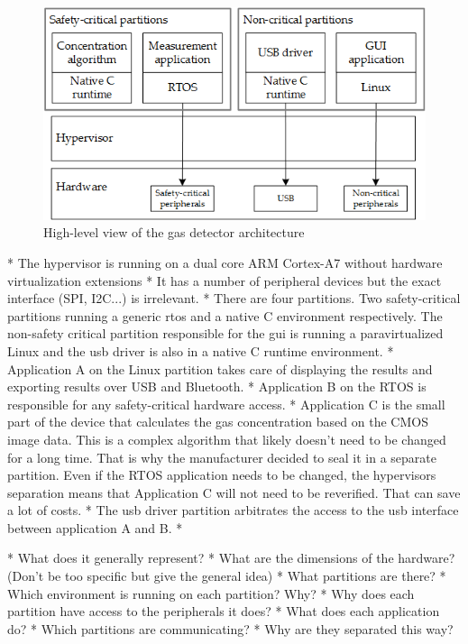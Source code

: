 \begin{figure}[ht!]
\centering
\includegraphics[scale=0.75]{Figures/gas_detect_high_level_no_ipc_with_criticality.png}
\decoRule
\caption{High-level view of the gas detector architecture}
\label{fig:gas_detect_high_level}
\end{figure}

\newcommand{\bToa}{3}
\newcommand{\bToc}{1}
\newcommand{\cTob}{2}
\newcommand{\usbToa}{4}
\newcommand{\aTousb}{4}
\newcommand{\usbTob}{5}
\newcommand{\bTousb}{5}

* The hypervisor is running on a dual core ARM Cortex-A7 without hardware virtualization extensions
* It has a number of peripheral devices but the exact interface (SPI, I2C...) is irrelevant.
* There are four partitions. Two safety-critical partitions running a generic \acrshort{rtos} and a native C environment respectively. The non-safety critical partition responsible for the \acrshort{gui} is running a paravirtualized Linux and the \acrshort{usb} driver is also in a native C runtime environment.
* Application A on the Linux partition takes care of displaying the results and exporting results over USB and Bluetooth.
* Application B on the RTOS is responsible for any safety-critical hardware access.
* Application C is the small part of the device that calculates the gas concentration based on the CMOS image data. This is a complex algorithm that likely doesn't need to be changed for a long time. That is why the manufacturer decided to seal it in a separate partition. Even if the RTOS application needs to be changed, the hypervisors separation means that Application C will not need to be reverified. That can save a lot of costs.
* The \acrshort{usb} driver partition arbitrates the access to the \acrshort{usb} interface between application A and B. 
* 

* What does it generally represent?
* What are the dimensions of the hardware? (Don't be too specific but give the general idea)
* What partitions are there?
* Which environment is running on each partition? Why?
* Why does each partition have access to the peripherals it does?
* What does each application do?
* Which partitions are communicating?
* Why are they separated this way?

